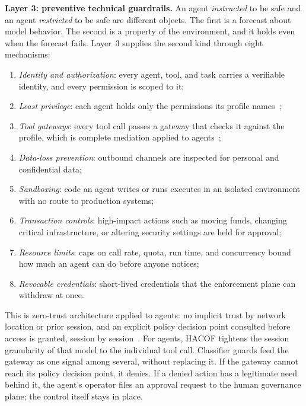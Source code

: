 \documentclass[journal]{IEEEtran}
\newcommand{\hacof}{HACOF}
\begin{document}
\textbf{Layer 3: preventive technical guardrails.} An agent \textit{instructed} to be safe and an agent \textit{restricted} to be safe are different objects. The first is a forecast about model behavior. The second is a property of the environment, and it holds even when the forecast fails. Layer~3 supplies the second kind through eight mechanisms:
\begin{enumerate}
  \item \textit{Identity and authorization}: every agent, tool, and task carries a verifiable identity, and every permission is scoped to it;
  \item \textit{Least privilege}: each agent holds only the permissions its profile names~\cite{saltzer1975protection};
  \item \textit{Tool gateways}: every tool call passes a gateway that checks it against the profile, which is complete mediation applied to agents~\cite{saltzer1975protection};
  \item \textit{Data-loss prevention}: outbound channels are inspected for personal and confidential data;
  \item \textit{Sandboxing}: code an agent writes or runs executes in an isolated environment with no route to production systems;
  \item \textit{Transaction controls}: high-impact actions such as moving funds, changing critical infrastructure, or altering security settings are held for approval;
  \item \textit{Resource limits}: caps on call rate, quota, run time, and concurrency bound how much an agent can do before anyone notices;
  \item \textit{Revocable credentials}: short-lived credentials that the enforcement plane can withdraw at once.
\end{enumerate}
This is zero-trust architecture applied to agents: no implicit trust by network location or prior session, and an explicit policy decision point consulted before access is granted, session by session~\cite{nist2020zerotrust}.
For agents, \hacof{} tightens the session granularity of that model to the individual tool call. Classifier guards feed the gateway as one signal among several, without replacing it. If the gateway cannot reach its policy decision point, it denies. If a denied action has a legitimate need behind it, the agent's operator files an approval request to the human governance plane; the control itself stays in place.
\end{document}
